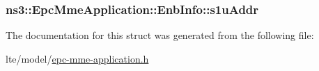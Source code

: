 \subsubsection[{\texorpdfstring{s1u\+Addr}{s1uAddr}}]{ ns3\+::\+Epc\+Mme\+Application\+::\+Enb\+Info\+::s1u\+Addr}\hypertarget{structns3_1_1EpcMmeApplication_1_1EnbInfo_ab5d4b2e41f685a4bcac968da0eda1fa1}{}\label{structns3_1_1EpcMmeApplication_1_1EnbInfo_ab5d4b2e41f685a4bcac968da0eda1fa1}


The documentation for this struct was generated from the following file\+:\begin{DoxyCompactItemize}
\item 
lte/model/\hyperlink{epc-mme-application_8h}{epc-\/mme-\/application.\+h}\end{DoxyCompactItemize}
